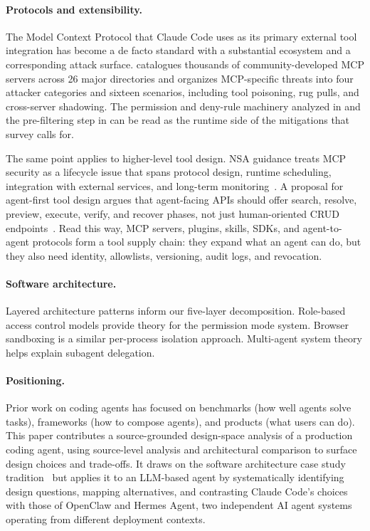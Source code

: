\paragraph{Protocols and extensibility.}
The Model Context Protocol that Claude Code uses as its primary external tool integration has become a de facto standard with a substantial ecosystem and a corresponding attack surface. \citet{hou2025mcpsurvey} catalogues thousands of community-developed MCP servers across 26 major directories and organizes MCP-specific threats into four attacker categories and sixteen scenarios, including tool poisoning, rug pulls, and cross-server shadowing. The permission and deny-rule machinery analyzed in  and the pre-filtering step in  can be read as the runtime side of the mitigations that survey calls for.

The same point applies to higher-level tool design. NSA guidance treats MCP security as a lifecycle issue that spans protocol design, runtime scheduling, integration with external services, and long-term monitoring~\citep{nsa2026mcpsecurity}. A proposal for agent-first tool design argues that agent-facing APIs should offer search, resolve, preview, execute, verify, and recover phases, not just human-oriented CRUD endpoints~\citep{pan2026agentfirstapi}. Read this way, MCP servers, plugins, skills, SDKs, and agent-to-agent protocols form a tool supply chain: they expand what an agent can do, but they also need identity, allowlists, versioning, audit logs, and revocation.

\paragraph{Software architecture.}
Layered architecture patterns \citep{garlan1993architecture} inform our five-layer decomposition. Role-based access control models \citep{sandhu1996rbac} provide theory for the permission mode system. Browser sandboxing \citep{reis2009isolating} is a similar per-process isolation approach. Multi-agent system theory \citep{wooldridge2009multiagent} helps explain subagent delegation.

\paragraph{Positioning.}
Prior work on coding agents has focused on benchmarks (how well agents solve tasks), frameworks (how to compose agents), and products (what users can do). This paper contributes a source-grounded design-space analysis of a production coding agent, using source-level analysis and architectural comparison to surface design choices and trade-offs. It draws on the software architecture case study tradition~\citep{garlan1993architecture} but applies it to an LLM-based agent by systematically identifying design questions, mapping alternatives, and contrasting Claude Code's choices with those of OpenClaw and Hermes Agent, two independent AI agent systems operating from different deployment contexts.
